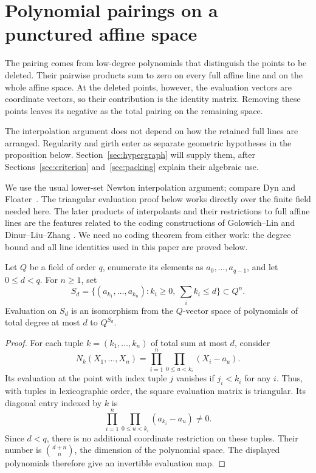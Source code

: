 \section{Polynomial pairings on a punctured affine space}
\label{sec:pairing}

The pairing comes from low-degree polynomials that distinguish the points
to be deleted. Their pairwise products sum to zero on every full affine
line and on the whole affine space. At the deleted points, however, the
evaluation vectors are coordinate vectors, so their contribution is the
identity matrix. Removing these points leaves its negative as the total
pairing on the remaining space.

The interpolation argument does not depend on how the retained full lines
are arranged. Regularity and girth enter as separate geometric hypotheses
in the proposition below. Section~\ref{sec:hypergraph} will supply them,
after Sections~\ref{sec:criterion} and~\ref{sec:packing} explain their
algebraic use.

We use the usual lower-set Newton interpolation argument; compare
Dyn and Floater~\cite{DynFloater2014}. The triangular
evaluation proof below works directly over the finite field needed here.
The later products of interpolants and their restrictions to full affine
lines are the features related to the coding constructions of
Golowich--Lin \cite[Sections~2.1.2--2.1.3]{GolowichLin2024} and
Dinur--Liu--Zhang \cite[Sections~3.4--3.5]{DinurLiuZhang2025}.
We need no coding theorem from either work: the degree bound and all line
identities used in this paper are proved below.

\begin{lemma}
\label{lem:interpolation}
Let $Q$ be a field of order $q$, enumerate its elements as $a_0,\ldots,a_{q-1}$, and let $0\le d<q$. For $n\ge1$, set
\[
S_d=\{(a_{k_1},\ldots,a_{k_n}): k_i\ge0,\ \textstyle\sum_i k_i\le d\}\subset Q^n.
\]
Evaluation on $S_d$ is an isomorphism from the $Q$-vector space of polynomials of total degree at most $d$ to $Q^{S_d}$.
\end{lemma}
\begin{proof}
For each tuple $k=(k_1,\ldots,k_n)$ of total sum at most $d$, consider
\[
N_k(X_1,\ldots,X_n)=\prod_{i=1}^n\prod_{0\le u<k_i}(X_i-a_u).
\]
Its evaluation at the point with index tuple $j$ vanishes if $j_i<k_i$ for any $i$. Thus, with tuples in lexicographic order, the square evaluation matrix is triangular. Its diagonal entry indexed by $k$ is
\[
\prod_{i=1}^n\prod_{0\le u<k_i}(a_{k_i}-a_u)\ne0.
\]
Since $d<q$, there is no additional coordinate restriction on these tuples. Their number is $\binom{d+n}{n}$, the dimension of the polynomial space. The displayed polynomials therefore give an invertible evaluation map.
\end{proof}

